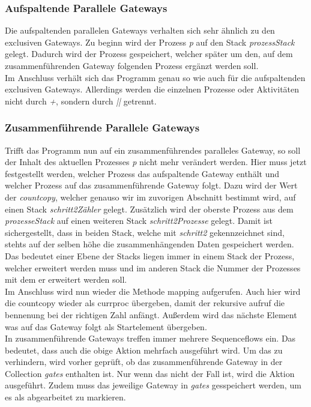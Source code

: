 \subsubsection{Aufspaltende Parallele Gateways}
Die aufspaltenden parallelen Gateways verhalten sich sehr ähnlich zu den exclusiven Gateways. Zu beginn wird der Prozess \textit{p} auf den Stack \textit{prozessStack} gelegt. Dadurch wird der Prozess gespeichert, welcher später um den, auf dem zusammenführenden Gateway folgenden Prozess ergänzt werden soll.\\
Im Anschluss verhält sich das Programm genau so wie auch für die aufspaltenden exclusiven Gateways. Allerdings werden die einzelnen Prozesse oder Aktivitäten nicht durch \textit{+}, sondern durch \textit{||} getrennt.
\subsubsection{Zusammenführende Parallele Gateways}
Trifft das Programm nun auf ein zusammenführendes paralleles Gateway, so soll der Inhalt des aktuellen Prozesses \textit{p} nicht mehr verändert werden. Hier muss jetzt festgestellt werden, welcher Prozess das aufspaltende Gateway enthält und welcher Prozess auf das zusammenführende Gateway folgt. Dazu wird der Wert der \textit{countcopy}, welcher genauso wir im zuvorigen Abschnitt bestimmt wird, auf einen Stack \textit{schritt2Zähler} gelegt. Zusätzlich wird der oberste Prozess aus dem \textit{prozesseStack} auf einen weiteren Stack \textit{schritt2Prozesse} gelegt. Damit ist sichergestellt, dass in beiden Stack, welche mit \textit{schritt2} gekennzeichnet sind, stehts auf der selben höhe die zusammenhängenden Daten gespeichert werden. Das bedeutet einer Ebene der Stacks liegen immer in einem Stack der Prozess, welcher erweitert werden muss und im anderen Stack die Nummer der Prozesses mit dem er erweitert werden soll.\\
Im Anschluss wird nun wieder die Methode mapping aufgerufen. Auch hier wird die countcopy wieder als currproc übergeben, damit der rekursive aufruf die bennenung bei der richtigen Zahl anfängt. Außerdem wird das nächste Element was auf das Gateway folgt als Startelement übergeben.\\
In zusammenführende Gateways treffen immer mehrere Sequenceflows ein. Das bedeutet, dass auch die obige Aktion mehrfach ausgeführt wird. Um das zu verhindern, wird vorher geprüft, ob das zusammenführende Gateway in der Collection \textit{gates} enthalten ist. Nur wenn das nicht der Fall ist, wird die Aktion ausgeführt. Zudem muss das jeweilige Gateway in \textit{gates} gesspeichert werden, um es als abgearbeitet zu markieren.
